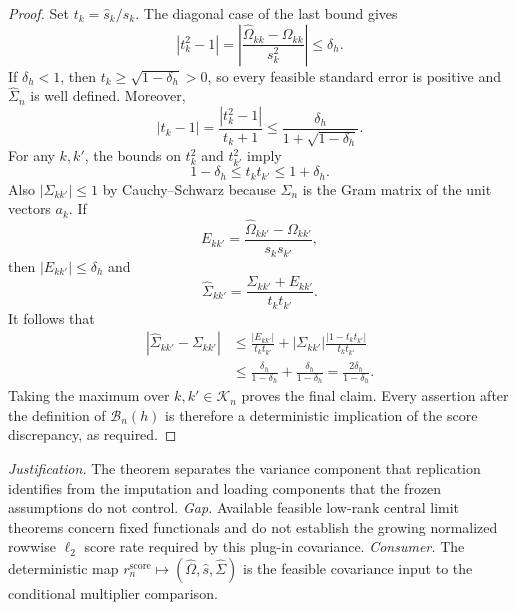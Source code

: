 \documentclass{article}
\begin{document}
\begin{proof}
Set \(t_k=\widehat s_k/s_k\).  The diagonal case of the last bound gives
\[
 |t_k^2-1|
 =\left|\frac{\widehat\Omega_{kk}-\Omega_{kk}}{s_k^2}\right|
 \le\delta_h.
\]
If \(\delta_h<1\), then
\(t_k\ge\sqrt{1-\delta_h}>0\), so every feasible standard error is
positive and \(\widehat\Sigma_n\) is well defined.  Moreover,
\[
 |t_k-1|
 =\frac{|t_k^2-1|}{t_k+1}
 \le\frac{\delta_h}{1+\sqrt{1-\delta_h}}.
\]
For any \(k,k'\), the bounds on \(t_k^2\) and \(t_{k'}^2\) imply
\[
 1-\delta_h\le t_kt_{k'}\le1+\delta_h.
\]
Also \(|\Sigma_{kk'}|\le1\) by Cauchy--Schwarz because \(\Sigma_n\) is
the Gram matrix of the unit vectors \(a_k\).  If
\[
 E_{kk'}=
 \frac{\widehat\Omega_{kk'}-\Omega_{kk'}}{s_ks_{k'}},
\]
then \(|E_{kk'}|\le\delta_h\) and
\[
 \widehat\Sigma_{kk'}
 =\frac{\Sigma_{kk'}+E_{kk'}}{t_kt_{k'}}.
\]
It follows that
\[
 \begin{aligned}
 |\widehat\Sigma_{kk'}-\Sigma_{kk'}|
 &\le \frac{|E_{kk'}|}{t_kt_{k'}}
 +|\Sigma_{kk'}|\frac{|1-t_kt_{k'}|}{t_kt_{k'}}\\
 &\le\frac{\delta_h}{1-\delta_h}
 +\frac{\delta_h}{1-\delta_h}
 =\frac{2\delta_h}{1-\delta_h}.
 \end{aligned}
\]
Taking the maximum over \(k,k'\in\mathcal K_n\) proves the final claim.
Every assertion after the definition of \(\mathcal B_n(h)\) is therefore
a deterministic implication of the score discrepancy, as required.
\end{proof}
\par\smallskip\noindent \textit{Justification.} The theorem separates the variance component that replication identifies from the imputation and loading components that the frozen assumptions do not control. \textit{Gap.} Available feasible low-rank central limit theorems concern fixed functionals and do not establish the growing normalized rowwise \(\ell_2\) score rate required by this plug-in covariance. \textit{Consumer.} The deterministic map \(r_n^{\mathrm{score}}\mapsto(\widehat\Omega,\widehat s,\widehat\Sigma)\) is the feasible covariance input to the conditional multiplier comparison.
\end{document}
